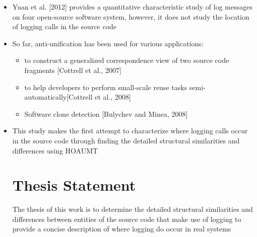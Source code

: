 \begin{itemize} [leftmargin=.01in]
\section{Overview of related work} \label{intro-ov-re}
\item Yuan et al. [2012]  provides a quantitative characteristic study of log messages on four open-source software system, however, it does not study the location of logging calls in the source code
\item So far, anti-unification has been used for various applications:
\begin{itemize} [leftmargin=.3in]
\item to construct a generalized correspondence view of two source code fragments [Cottrell et al., 2007]
\item to help developers to perform small-scale reuse tasks semi-automatically[Cottrell et al., 2008]
\item Software clone detection [Bulychev and Minea, 2008]
\end{itemize}
\item This study makes the first attempt to characterize where logging calls occur in the source code through finding the detailed structural similarities and differences using HOAUMT

\section{Thesis Statement} \label{intro-stmt}
The thesis of this work is to determine the detailed structural similarities and differences between entities of the source code that make use of logging to provide a concise description of where logging do occur in real systems


\end{itemize}
